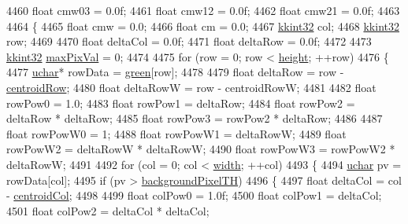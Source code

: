 \begin{DoxyCode}
4460   \textcolor{keywordtype}{float} cmw03 = 0.0f;
4461   \textcolor{keywordtype}{float} cmw12 = 0.0f;
4462   \textcolor{keywordtype}{float} cmw21 = 0.0f;
4463 
4464   \{
4465     \textcolor{keywordtype}{float}  cmw = 0.0;
4466     \textcolor{keywordtype}{float}  cm  = 0.0;
4467     \hyperlink{namespace_k_k_b_a8fa4952cc84fda1de4bec1fbdd8d5b1b}{kkint32}  col;
4468     \hyperlink{namespace_k_k_b_a8fa4952cc84fda1de4bec1fbdd8d5b1b}{kkint32}  row;
4469 
4470     \textcolor{keywordtype}{float}   deltaCol = 0.0f;
4471     \textcolor{keywordtype}{float}   deltaRow = 0.0f;
4472    
4473     \hyperlink{namespace_k_k_b_a8fa4952cc84fda1de4bec1fbdd8d5b1b}{kkint32}  \hyperlink{class_k_k_b_1_1_raster_a4f37d3b83826f522f61af0918a1d5546}{maxPixVal} = 0;
4474 
4475     \textcolor{keywordflow}{for}  (row = 0;  row < \hyperlink{class_k_k_b_1_1_raster_af39ff189de4fbb6de98392e187efafb7}{height};  ++row)
4476     \{
4477       \hyperlink{namespace_k_k_b_ace9969169bf514f9ee6185186949cdf7}{uchar}*  rowData = \hyperlink{class_k_k_b_1_1_raster_a2d2238911145488e226cd2e34fc8448c}{green}[row];
4478 
4479       \textcolor{keywordtype}{float}  deltaRow  = row - \hyperlink{class_k_k_b_1_1_raster_a3380e5734ec57a147e36c734cc83c5ff}{centroidRow};
4480       \textcolor{keywordtype}{float}  deltaRowW = row - centroidRowW;
4481 
4482       \textcolor{keywordtype}{float}  rowPow0 = 1.0;
4483       \textcolor{keywordtype}{float}  rowPow1 = deltaRow;
4484       \textcolor{keywordtype}{float}  rowPow2 = deltaRow * deltaRow;
4485       \textcolor{keywordtype}{float}  rowPow3 = rowPow2  * deltaRow;
4486 
4487       \textcolor{keywordtype}{float}  rowPowW0 = 1;
4488       \textcolor{keywordtype}{float}  rowPowW1 = deltaRowW;
4489       \textcolor{keywordtype}{float}  rowPowW2 = deltaRowW * deltaRowW;
4490       \textcolor{keywordtype}{float}  rowPowW3 = rowPowW2  * deltaRowW;
4491 
4492       \textcolor{keywordflow}{for}  (col = 0;  col < \hyperlink{class_k_k_b_1_1_raster_ae0bcc103e191c3421d7692dc69ceb554}{width};  ++col)
4493       \{
4494         \hyperlink{namespace_k_k_b_ace9969169bf514f9ee6185186949cdf7}{uchar} pv = rowData[col];
4495         \textcolor{keywordflow}{if}  (pv > \hyperlink{class_k_k_b_1_1_raster_a3c4e96eaf48274f5d8912617f81f2a0b}{backgroundPixelTH})
4496         \{
4497           \textcolor{keywordtype}{float}  deltaCol = col - \hyperlink{class_k_k_b_1_1_raster_ac4cb3984d20f6eef6fd4f201681ea1d5}{centroidCol};
4498 
4499           \textcolor{keywordtype}{float}  colPow0 = 1.0f;
4500           \textcolor{keywordtype}{float}  colPow1 = deltaCol;
4501           \textcolor{keywordtype}{float}  colPow2 = deltaCol * deltaCol;

\end{DoxyCode}
